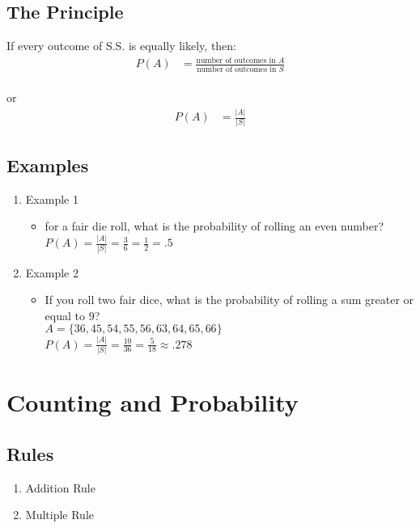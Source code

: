 \documentclass[12pt]{article}
\begin{document}
        \subsection{The Principle}
            If every outcome of S.S. is equally likely, then:
            \begin{align*}
                P(A) &= \frac{\text{number of outcomes in } A}{\text{number of outcomes in } S}
            \end{align*}
            \\or
            \begin{align*}
                P(A) &= \frac{|A|}{|S|}
            \end{align*}
        \subsection{Examples}
            \begin{enumerate}
                \item Example 1
                \begin{itemize}
                    \item for a fair die roll, what is the probability of rolling an even number?
                    \\$P(A) = \frac{|A|}{|S|} = \frac{3}{6} = \frac{1}{2} = .5$
                \end{itemize}
                \item Example 2
                \begin{itemize}
                    \item If you roll two fair dice, what is the probability of rolling a sum greater or equal to $9$?
                    \\$A = \{36, 45, 54, 55, 56, 63, 64, 65, 66\}$
                    \\$P(A) = \frac{|A|}{|S|} = \frac{10}{36} = \frac{5}{18} \approx .278$
                \end{itemize}
            \end{enumerate}
    \section{Counting and Probability}
        \subsection{Rules}
            \begin{enumerate}
                \item Addition Rule
                \item Multiple Rule
            \end{enumerate}
\end{document}
